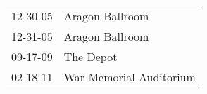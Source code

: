 \begin{supertabular}{p{0.07\textwidth}p{0.23\textwidth}}
 12-30-05 &          Aragon Ballroom \\
 12-31-05 &          Aragon Ballroom \\
 09-17-09 &                The Depot \\
 02-18-11 &  War Memorial Auditorium \\
\end{supertabular}

